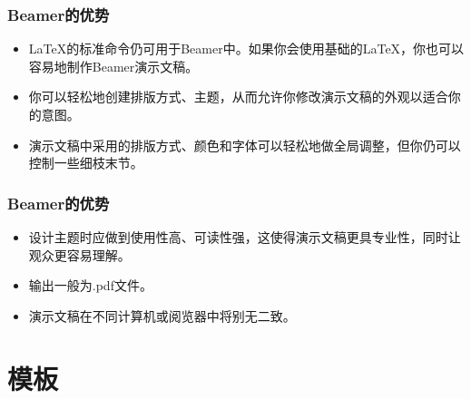 \documentclass[aspectratio=1610,utf8]{beamer}
\begin{document}
\begin{frame}
  \frametitle{Beamer的优势}

  \begin{itemize}
    \setlength{\itemsep}{8pt}
    \item \LaTeX{}的标准命令仍可用于Beamer中。如果你会使用基础的\LaTeX{}，你也可以容易地制作Beamer演示文稿。
    \item 
       你可以轻松地创建排版方式、主题，从而允许你修改演示文稿的外观以适合你的意图。
    \item 
      演示文稿中采用的排版方式、颜色和字体可以轻松地做全局调整，但你仍可以控制一些细枝末节。
  \end{itemize}
  
\end{frame}


\begin{frame}
  \frametitle{Beamer的优势}

  \begin{itemize}
    \setlength{\itemsep}{8pt}
    \item 
      设计主题时应做到使用性高、可读性强，这使得演示文稿更具专业性，同时让观众更容易理解。
    \item 
      输出一般为\alert{.pdf}文件。
    \item 
      \alert{演示文稿在不同计算机或阅览器中将别无二致。}
  \end{itemize}
  
\end{frame}

\section{模板}
\end{document}
